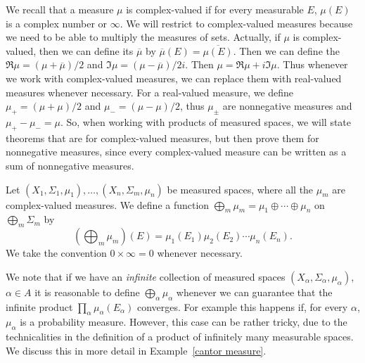 We recall that a measure $\mu$ is complex-valued if for every measurable $E$, $\mu(E)$ is a complex number or $\infty$.
We will restrict to complex-valued measures because we need to be able to multiply the measures of sets.
Actually, if $\mu$ is complex-valued, then we can define its  $\overline \mu$ by $\overline \mu(E) = \overline{\mu(E)}$.
Then we can define the  $\Re \mu = (\mu + \overline \mu)/2$ and  $\Im \mu = (\mu - \overline \mu)/2i$.
Then $\mu = \Re \mu + i\Im \mu$.
Thus whenever we work with complex-valued measures, we can replace them with real-valued measures whenever necessary.
For a real-valued measure, we define $\mu_+ = (\mu + \mu)/2$ and $\mu_- = (\mu - \mu)/2$, thus $\mu_\pm$ are nonnegative measures and $\mu_+ - \mu_- = \mu$.
So, when working with products of measured spaces, we will state theorems that are for complex-valued measures, but then prove them for nonnegative measures, since every complex-valued measure can be written as a sum of nonnegative measures.

\begin{definition}
Let $(X_1, \Sigma_1, \mu_1), \dots, (X_{n}, \Sigma_{m}, \mu_{n})$ be measured spaces, where all the $\mu_{m}$ are complex-valued measures.
We define a function $\bigoplus_{m} \mu_{m} = \mu_1 \oplus \cdots \oplus \mu_{n}$ on $\bigoplus_{m} \Sigma_{m}$ by
\[\left(\bigoplus_{m} \mu_{m}\right)(E) = \mu_1(E_1)\mu_2(E_2) \cdots \mu_{n}(E_{n}).\]
We take the convention $0 \times \infty = 0$ whenever necessary.
\end{definition}

We note that if we have an \emph{infinite} collection of measured spaces $(X_\alpha, \Sigma_\alpha, \mu_\alpha)$, $\alpha \in A$ it is reasonable to define $\bigoplus_{\alpha} \mu_\alpha$ whenever we can guarantee that the infinite product $\prod_{\alpha} \mu_\alpha(E_\alpha)$ converges.
For example this happens if, for every $\alpha$, $\mu_\alpha$ is a probability measure.
However, this case can be rather tricky, due to the technicalities in the definition of a product of infinitely many measurable spaces.
We discuss this in more detail in Example~\ref{cantor measure}.

